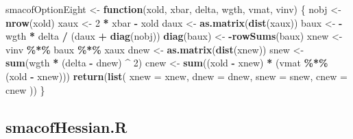 \documentclass[
  12pt,
]{article}
\newenvironment{Shaded}{\begin{snugshade}}{\end{snugshade}}
\newcommand{\AttributeTok}[1]{\textcolor[rgb]{0.13,0.29,0.53}{#1}}
\newcommand{\ControlFlowTok}[1]{\textcolor[rgb]{0.13,0.29,0.53}{\textbf{#1}}}
\newcommand{\DecValTok}[1]{\textcolor[rgb]{0.00,0.00,0.81}{#1}}
\newcommand{\FunctionTok}[1]{\textcolor[rgb]{0.13,0.29,0.53}{\textbf{#1}}}
\newcommand{\NormalTok}[1]{#1}
\newcommand{\OtherTok}[1]{\textcolor[rgb]{0.56,0.35,0.01}{#1}}
\newcommand{\SpecialCharTok}[1]{\textcolor[rgb]{0.81,0.36,0.00}{\textbf{#1}}}
\begin{document}
\begin{Shaded}
\begin{Highlighting}[]
\NormalTok{smacofOptionEight }\OtherTok{\textless{}{-}} \ControlFlowTok{function}\NormalTok{(xold, xbar, delta, wgth, vmat, vinv) \{}
\NormalTok{  nobj }\OtherTok{\textless{}{-}} \FunctionTok{nrow}\NormalTok{(xold)}
\NormalTok{  xaux }\OtherTok{\textless{}{-}} \DecValTok{2} \SpecialCharTok{*}\NormalTok{ xbar }\SpecialCharTok{{-}}\NormalTok{ xold}
\NormalTok{  daux }\OtherTok{\textless{}{-}} \FunctionTok{as.matrix}\NormalTok{(}\FunctionTok{dist}\NormalTok{(xaux))}
\NormalTok{  baux }\OtherTok{\textless{}{-}} \SpecialCharTok{{-}}\NormalTok{wgth }\SpecialCharTok{*}\NormalTok{ delta }\SpecialCharTok{/}\NormalTok{ (daux }\SpecialCharTok{+} \FunctionTok{diag}\NormalTok{(nobj))}
  \FunctionTok{diag}\NormalTok{(baux) }\OtherTok{\textless{}{-}} \SpecialCharTok{{-}}\FunctionTok{rowSums}\NormalTok{(baux)}
\NormalTok{  xnew }\OtherTok{\textless{}{-}}\NormalTok{ vinv }\SpecialCharTok{\%*\%}\NormalTok{ baux }\SpecialCharTok{\%*\%}\NormalTok{ xaux}
\NormalTok{  dnew }\OtherTok{\textless{}{-}} \FunctionTok{as.matrix}\NormalTok{(}\FunctionTok{dist}\NormalTok{(xnew))}
\NormalTok{  snew }\OtherTok{\textless{}{-}} \FunctionTok{sum}\NormalTok{(wgth }\SpecialCharTok{*}\NormalTok{ (delta }\SpecialCharTok{{-}}\NormalTok{ dnew) }\SpecialCharTok{\^{}} \DecValTok{2}\NormalTok{)}
\NormalTok{  cnew }\OtherTok{\textless{}{-}} \FunctionTok{sum}\NormalTok{((xold }\SpecialCharTok{{-}}\NormalTok{ xnew) }\SpecialCharTok{*}\NormalTok{ (vmat }\SpecialCharTok{\%*\%}\NormalTok{ (xold }\SpecialCharTok{{-}}\NormalTok{ xnew)))}
  \FunctionTok{return}\NormalTok{(}\FunctionTok{list}\NormalTok{(}
    \AttributeTok{xnew =}\NormalTok{ xnew,}
    \AttributeTok{dnew =}\NormalTok{ dnew,}
    \AttributeTok{snew =}\NormalTok{ snew,}
    \AttributeTok{cnew =}\NormalTok{ cnew}
\NormalTok{  ))}
\NormalTok{\}}
\end{Highlighting}
\end{Shaded}

\subsection{smacofHessian.R}\label{smacofhessian.r}
\end{document}
